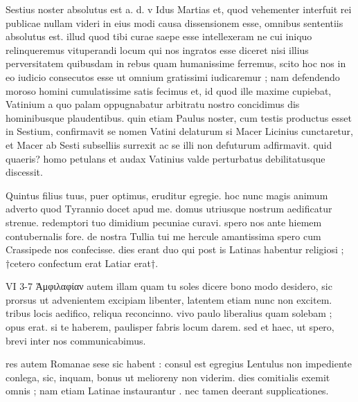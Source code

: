


 Sestius noster absolutus est a. d. v Idus Martias et, quod vehementer interfuit rei publicae nullam videri in eius modi causa dissensionem esse, omnibus sententiis absolutus est. illud quod tibi curae saepe esse intellexeram ne cui iniquo relinqueremus vituperandi locum qui nos ingratos esse diceret nisi illius perversitatem quibusdam in rebus quam humanissime ferremus, scito hoc nos in eo iudicio consecutos esse ut omnium gratissimi iudicaremur ; nam defendendo moroso homini cumulatissime satis fecimus et, id quod ille maxime cupiebat, Vatinium a quo palam oppugnabatur arbitratu nostro concidimus dis hominibusque plaudentibus. quin etiam Paulus noster, cum testis productus esset in Sestium, confirmavit se nomen Vatini delaturum si Macer Licinius cunctaretur, et Macer ab Sesti subselliis surrexit ac se illi non defuturum adfirmavit. quid quaeris? homo petulans et audax Vatinius valde perturbatus debilitatusque discessit.

 Quintus filius tuus, puer optimus, eruditur egregie. hoc nunc magis animum adverto quod Tyrannio docet apud me. domus utriusque nostrum aedificatur strenue. redemptori tuo dimidium pecuniae curavi. spero nos ante hiemem contubernalis fore. de nostra Tullia tui me hercule amantissima spero cum Crassipede nos confecisse. dies erant duo qui post is Latinas habentur religiosi ; †cetero confectum erat Latiar erat†.

 VI 3-7 Ἀμφιλαφίαν autem illam quam tu soles dicere bono modo desidero, sic prorsus ut advenientem excipiam libenter, latentem etiam nunc non excitem. tribus locis aedifico, reliqua reconcinno. vivo paulo liberalius quam solebam ; opus erat. si te haberem, paulisper fabris locum darem. sed et haec, ut spero, brevi inter nos communicabimus.

 res autem Romanae sese sic habent : consul est egregius Lentulus non impediente conlega, sic, inquam, bonus ut melioreny non viderim. dies comitialis exemit omnis ; nam etiam Latinae instaurantur . nec tamen deerant supplicationes.

